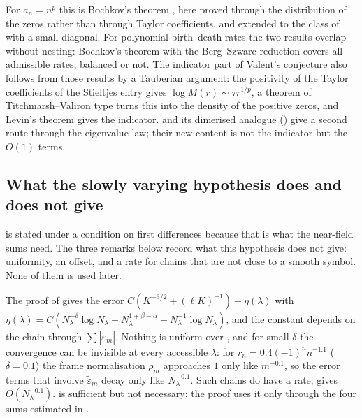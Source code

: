 For $a_n=n^p$ this is Bochkov's theorem \cite{Bochkov2021}, here proved through the
distribution of the zeros rather than through Taylor coefficients, and extended to the
class of  with a small diagonal. For polynomial birth--death rates the two
results overlap without nesting: Bochkov's theorem with the Berg--Szwarc reduction
\cite[Thm.~1.11, Rem.~1.10]{BergSzwarc2017} covers all admissible rates, balanced or not.
The indicator part of Valent's conjecture \cite[Conj.~1]{Valent1999} also follows from
those results by a Tauberian argument: the positivity of the Taylor coefficients of the
Stieltjes entry gives $\log M(r)\sim\tau r^{1/p}$, a theorem of Titchmarsh--Valiron type
\cite[\S7.2]{BGT} turns this into the density of the positive zeros, and Levin's theorem
gives the indicator.  and its dimerised analogue () give a
second route through the eigenvalue law; their new content is not the indicator but
the $O(1)$ terms.

\subsection{What the slowly varying hypothesis does and does not give}\label{sec:hypH}

 is stated under a condition on first differences because that is what the
near-field sums need. The three remarks below record what this hypothesis does not give: uniformity,
an offset, and a rate for chains that are not close to a smooth symbol. None of them is used later.

\begin{remark}\label{rem:nonuniform}
The proof of  gives the error $C(K^{-3/2}+(\ell K)^{-1})+\eta(\lambda)$ with
$\eta(\lambda)=C(N_\lambda^{-\delta}\log N_\lambda+N_\lambda^{1+\beta-\alpha}+N_\lambda^{-1}\log N_\lambda)$,
and the constant depends on the chain through $\sum|\tilde\varepsilon_m|$. Nothing is uniform
over , and for small $\delta$ the convergence can be invisible at every
accessible $\lambda$: for $r_n=0.4(-1)^nn^{-1.1}$ ($\delta=0.1$) the frame normalisation
$\rho_m$ approaches $1$ only like $m^{-0.1}$, so the error terms that involve
$\tilde\varepsilon_m$ decay only like $N_\lambda^{-0.1}$. Such chains do have a rate;  gives $O(N_\lambda^{-0.1})$.
 is sufficient but not necessary: the proof uses it only through the four
sums estimated in .
\end{remark}

